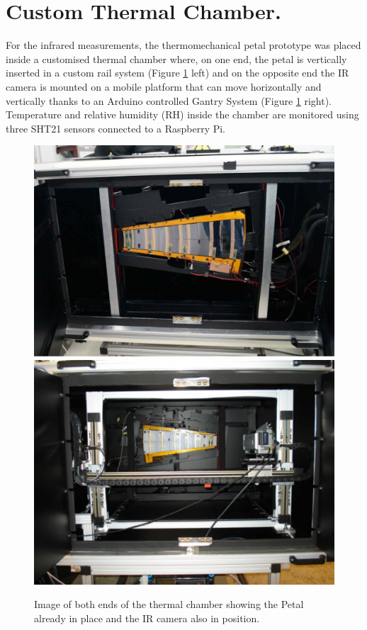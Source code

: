 	\section{Custom Thermal Chamber. }\label{section2.2}
	
		For the infrared measurements, the thermomechanical petal prototype was placed inside a customised thermal chamber where, on one end, the petal is vertically inserted in a custom rail system (Figure \ref{fig2.3} left) and on the opposite end the IR camera is mounted on a mobile platform that can move horizontally and vertically thanks to an Arduino controlled Gantry System (Figure \ref{fig2.3} right). Temperature and relative humidity (RH) inside the chamber are monitored using three SHT21 sensors connected  to a Raspberry Pi. 
		
		\begin{figure}[ht!]
			\centering
			\captionsetup{justification=centering,margin=2cm}
			\includegraphics[scale=0.25]{Figures/Chapter02/ChamberBack.jpg}
			\includegraphics[scale=0.26]{Figures/Chapter02/CamberFront.jpg}
			\caption{Image of both ends of the thermal chamber showing the Petal already in place and the IR camera also in position.}\label{fig2.3}
		\end{figure}
		
